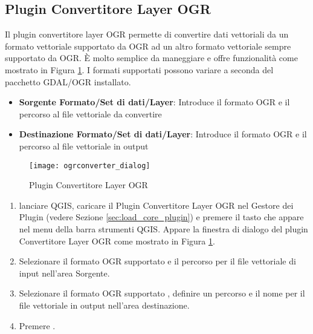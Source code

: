 
\subsection{Plugin Convertitore Layer OGR}


Il plugin convertitore layer OGR permette di convertire dati vettoriali da un formato vettoriale supportato da OGR ad un altro formato vettoriale sempre supportato da OGR. È molto semplice da maneggiare e offre funzionalità come mostrato in Figura \ref{fig:ogrconverter_dialog}. I formati supportati possono variare a seconda del pacchetto GDAL/OGR installato.


\begin{itemize}
\item \textbf{Sorgente Formato/Set di dati/Layer}: Introduce il formato OGR e il percorso al file vettoriale da convertire
\item \textbf{Destinazione Formato/Set di dati/Layer}: Introduce il formato OGR e il percorso al file vettoriale in output
\end{itemize}

\begin{figure}[ht]
   \begin{center}
   \caption{Plugin Convertitore Layer OGR \nixcaption}\label{fig:ogrconverter_dialog}\smallskip
   \texttt{[image: ogrconverter\_dialog]}
\end{center}  
\end{figure}

\begin{enumerate}
  \item lanciare QGIS, caricare il Plugin Convertitore Layer OGR nel Gestore dei Plugin (vedere Sezione 
  \ref{sec:load_core_plugin}) e premere il tasto  che appare nel menu della barra strumenti QGIS. Appare la finestra di dialogo del plugin Convertitore Layer OGR come mostrato in Figura \ref{fig:ogrconverter_dialog}.
  \item Selezionare il formato OGR supportato  e il percorso per il file vettoriale di input  nell'area Sorgente.
  \item Selezionare il formato OGR supportato , definire un percorso e il nome per il file vettoriale in output  nell'area destinazione.
  \item Premere .
\end{enumerate}

\newpage

